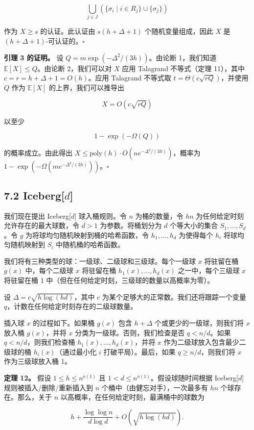 \documentclass[12pt,a4paper]{ctexart}
\theoremstyle{remark}
\begin{document}
$$\bigcup_{j\in J}\left(\{\sigma_i\mid i\in R_j\}\cup\{\sigma_j\}\right)$$

作为 $X\geq s$ 的认证。此认证由 $s(h+\Delta+1)$ 个随机变量组成，因此 $X$ 是 $(h+\Delta+1)$-可认证的。$\square$

\textbf{引理 3 的证明。} 设 $Q=m\exp(-\Delta^2/(3h))$。由论断 1，我们知道 $\mathbb{E}[X]\leq Q$。由论断 2，我们可以对 $X$ 应用 Talagrand 不等式（定理 11），其中 $c=r=h+\Delta+1=O(h)$。应用 Talagrand 不等式取 $t=\Theta(c\sqrt{rQ})$，并使用 $Q$ 作为 $\mathbb{E}[X]$ 的上界，我们可以推导出

$$X=O(c\sqrt{rQ})$$

以至少

$$1-\exp(-\Omega(Q))$$

的概率成立。由此得出 $X\leq\text{poly}(h)\cdot O(ne^{-\Delta^2/(3h)})$，概率为 $1-\exp(-\Omega(me^{-\Delta^2/(3h)}))$。$\square$

\subsection{7.2 Iceberg[$d$]}
我们现在提出 Iceberg[$d$] 球入桶规则。令 $n$ 为桶的数量，令 $hn$ 为任何给定时刻允许存在的最大球数，令 $d>1$ 为参数。将桶划分为 $d$ 个等大小的集合 $S_1,\ldots,S_d$。令 $g$ 为将球均匀随机映射到桶的哈希函数，令 $h_1,\ldots,h_d$ 为使得每个 $h_i$ 将球均匀随机映射到 $S_i$ 中随机桶的哈希函数。

我们将有三种类型的球：一级球、二级球和三级球。每个一级球 $x$ 将驻留在桶 $g(x)$ 中，每个二级球 $x$ 将驻留在桶 $h_1(x),\ldots,h_d(x)$ 之一中，每个三级球 $x$ 将驻留在桶 1 中（但在任何给定时刻，三级球的数量以高概率为零）。

设 $\Delta=c\sqrt{h\log(hd)}$，其中 $c$ 为某个足够大的正常数。我们还将跟踪一个变量 $q$，计数在任何给定时刻存在的二级球数量。

插入球 $x$ 的过程如下。如果桶 $g(x)$ 包含 $h+\Delta$ 个或更少的一级球，则我们将 $x$ 放入桶 $g(x)$，并将 $x$ 分类为一级球。否则，我们检查是否 $q<n/d$。如果 $q<n/d$，则我们检查桶 $h_1(x),\ldots,h_d(x)$，并将 $x$ 作为二级球放入包含最少二级球的桶 $h_i(x)$（通过最小化 $i$ 打破平局）。最后，如果 $q\geq n/d$，则我们将 $x$ 作为三级球放入桶 1。

\textbf{定理 12。} 假设 $1\leq h\leq n^{o(1)}$ 且 $1<d\leq n^{o(1)}$。假设球随时间根据 Iceberg[$d$] 规则被插入/删除/重新插入到 $n$ 个桶中（由健忘对手），一次最多有 $hn$ 个球存在。那么，关于 $n$ 以高概率，在任何给定时刻，最满桶中的球数为

$$h+\frac{\log\log n}{d\log d}+O\left(\sqrt{h\log(hd)}\right).$$
\end{document}
